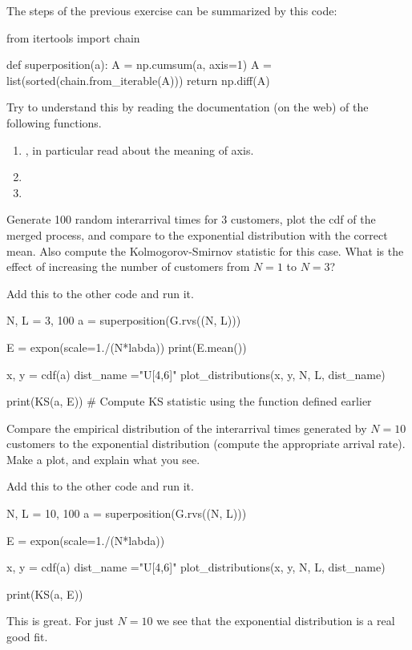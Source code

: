 \documentclass{scrartcl}
\begin{document}
\begin{exercise}
  The steps of the previous exercise can be summarized by this code:
\begin{pyverbatim}
from itertools import chain

def superposition(a):
A = np.cumsum(a, axis=1)
A = list(sorted(chain.from_iterable(A)))
return np.diff(A)

\end{pyverbatim}  

Try to understand this by reading the documentation (on the web) of the following functions.
\begin{enumerate}
\item {}, in particular read about the meaning of axis.
\item {}
\item {}
\end{enumerate}
\end{exercise}


\begin{exercise}
  Generate 100 random interarrival times for 3 customers, plot the cdf of the merged process, and compare to the exponential distribution with the correct mean. Also compute the Kolmogorov-Smirnov statistic for this case. What is the effect of increasing the number of customers from $N=1$ to $N=3$?
\begin{solution}
Add this to the other code and run it. 
\begin{pyverbatim}
N, L = 3, 100
a = superposition(G.rvs((N, L)))

E = expon(scale=1./(N*labda))
print(E.mean())

x, y = cdf(a)
dist_name ="U[4,6]"
plot_distributions(x, y, N, L, dist_name)

print(KS(a, E)) # Compute KS statistic using the function defined earlier
\end{pyverbatim}

\end{solution}
\end{exercise}


\begin{exercise}
  Compare  the empirical distribution of the interarrival times generated by  $N=10$ customers to the exponential distribution (compute the appropriate arrival rate). Make a plot, and explain what you see.
\begin{solution}
Add this to the other code and run it. 
\begin{pyverbatim}
N, L = 10, 100
a = superposition(G.rvs((N, L)))

E = expon(scale=1./(N*labda))

x, y = cdf(a)
dist_name ="U[4,6]"
plot_distributions(x, y, N, L, dist_name)

print(KS(a, E)) 
\end{pyverbatim}

This is great. For just $N=10$ we see that the exponential distribution is a real good fit. 
\end{solution}
\end{exercise}
\end{document}
